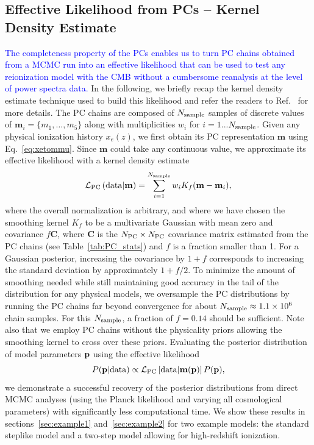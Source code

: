 \documentclass[prd,twocolumn,amsmath,amssymb,floatfix,superscriptaddress,nofootinbib]{revtex4-1}
\newcommand{\sample}{{\rm sample}}
\newcommand{\beq}{\begin{equation}}
\newcommand{\eeq}{\end{equation}}
\newcommand{\wh}[1]{\textcolor{blue}{#1}}
\begin{document}
\subsection{Effective Likelihood from PCs -- Kernel Density Estimate}
\label{sec:KDE}
\wh{The completeness property of the PCs enables us to turn PC chains obtained from a MCMC run into an effective likelihood that can be used to test any reionization model with the CMB without a cumbersome reanalysis at the level of power spectra data.}  In the following, we briefly recap the kernel density estimate technique used to build this likelihood and refer the readers to Ref.~\cite{Heinrich:2016ojb} for more details.
The PC chains are composed of $N_{\rm sample}$ samples of discrete values of $\mathbf{m}_i = \{m_1, \ldots, m_5\}$ along with multiplicities $w_i$ for $i = 1$...$N_{\rm sample}$. Given any physical ionization history $x_e(z)$, we first obtain its PC representation $\mathbf{m}$ using Eq.~\ref{eq:xetommu}. Since $\mathbf{m}$ could take any continuous value, we approximate its effective likelihood with a kernel density estimate
\beq
{\cal L}_{\rm PC}\left({\rm data}|\mathbf{m} \right)  = \sum_{i = 1}^{N_{\rm sample}} w_i K_f(\mathbf{m}-\mathbf{m}_i),
\eeq
where the overall normalization is arbitrary, and where we have chosen the smoothing kernel $K_f$ to be a  multivariate Gaussian with mean zero and covariance $f\mathbf{C}$, where $\mathbf{C}$ is the $N_{\rm PC} \times N_{\rm PC}$ covariance matrix estimated from the PC chains (see Table~\ref{tab:PC_stats}) and $f$ is a fraction smaller than 1.
For a Gaussian posterior, increasing the covariance by $1+f$ corresponds to increasing the standard deviation by approximately $1+f/2$. To minimize the amount of smoothing needed while still maintaining good accuracy in the tail of the distribution for any physical models, we oversample the PC distributions by running the PC chains far beyond convergence for about $N_{\sample} \approx 1.1 \times 10^{6}$ chain samples. 
For this $N_{\sample}$, a fraction of $f = 0.14$ should be sufficient. Note also that we employ PC chains without the physicality priors allowing the smoothing kernel to cross over these priors. 
Evaluating the posterior distribution of model parameters $\bf p$ using the effective likelihood
\begin{equation}
P({\bf p}| {\rm data}) \propto {\cal L}_{\rm PC}\left[ {\rm data}|\mathbf{m}(\bf p) \right] P(\bf p),
\end{equation}
we demonstrate a successful recovery of the posterior distributions from direct MCMC analyses (using the Planck likelihood and varying all cosmological parameters) with significantly less computational time. We show these results in sections~\ref{sec:example1} and~\ref{sec:example2} for two example models: the standard steplike model and a two-step model allowing for high-redshift ionization. 
\end{document}

